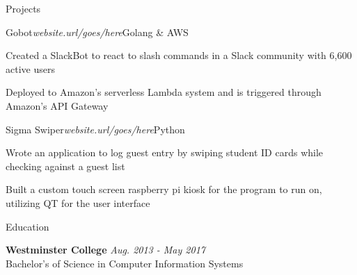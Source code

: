 \documentclass{resume} %
\begin{document}
\begin{rSection}{\vspace{-5pt}Projects}

\begin{rSubsection}{\vspace{-5pt}Gobot}{\em website.url/goes/here}{Golang \& AWS}{}
\item {Created a SlackBot to react to slash commands in a Slack community with 6,600 active users}
\item {Deployed to Amazon's serverless Lambda system and is triggered through Amazon's API Gateway}
\end{rSubsection}

\begin{rSubsection}{Sigma Swiper}{\em website.url/goes/here}{Python}{}
\item {Wrote an application to log guest entry by swiping student ID cards while checking against a guest list}
\item {Built a custom touch screen raspberry pi kiosk for the program to run on, utilizing QT for the user interface}
\end{rSubsection}

\end{rSection}






\begin{rSection}{\vspace{-10pt}Education}

  {\bf Westminster College} \hfill {\em Aug. 2013 - May 2017} 
  \\ Bachelor's of Science in Computer Information Systems


\end{rSection}
\end{document}
